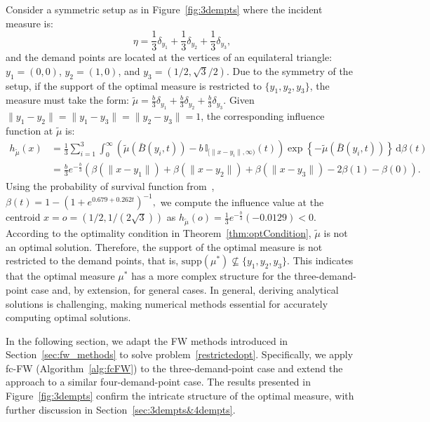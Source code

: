 \documentclass[stsy,sglanonrev]{informs4}
\newcommand{\death}{{\beta}}
\begin{document}
Consider a symmetric setup as in Figure~\ref{fig:3dempts} where the incident measure is:
\begin{equation*}
    \eta = \frac{1}{3} \delta_{y_1} + \frac{1}{3} \delta_{y_2} + \frac{1}{3} \delta_{y_3},
\end{equation*}
and the demand points are located at the vertices of an equilateral triangle: \(y_1 = (0,0)\), \(y_2 = (1,0)\), and \(y_3 = \left(1/2, \sqrt{3}/2\right)\). Due to the symmetry of the setup, if the support of the optimal measure is restricted to \(\{y_1, y_2, y_3\}\), the measure must take the form:
$\tilde{\mu} = \frac{b}{3} \delta_{y_1} + \frac{b}{3} \delta_{y_2} + \frac{b}{3} \delta_{y_3}.$ Given \(\|y_1 - y_2\| = \|y_1 - y_3\| = \|y_2 - y_3\| = 1\), the corresponding influence function at \(\tilde{\mu}\) is:
\begin{align}
    h_{\tilde{\mu}}(x) &= \frac{1}{3}\sum_{i=1}^3 \int_0^{\infty} 
    \left( \tilde{\mu}\left(\bar{B}(y_i,t) \right) - b \, \mathbb{I}_{[\|x-y_i \|,\infty)}(t) \right) 
    \exp\left\{-\tilde{\mu}\left(\bar{B}(y_i,t) \right) \right\} \, \mathrm{d}\death(t) \nonumber \\ 
    &= \frac{b}{3} e^{-\frac{b}{3}} \left( 
        \death(\|x-y_1 \|) + \death(\|x-y_2 \|) + \death(\|x-y_3 \|) - 2\death(1) - \death(0) \right).
\end{align} Using the probability of survival function from~\cite{waalewijn2001survival,van2024modeling}, $\death(t) = 1 - \left(1 + e^{0.679 + 0.262t}\right)^{-1},$ we compute the influence value at the centroid \(x = o = (1/2, 1/(2\sqrt 3))\) as $h_{\tilde{\mu}}(o) = \frac{1}{3} e^{-\frac{b}{3}} (-0.0129) < 0.$ According to the optimality condition in Theorem~\ref{thm:optCondition}, \(\tilde{\mu}\) is not an optimal solution. Therefore, the support of the optimal measure is not restricted to the demand points, that is, \(\mathrm{supp}(\mu^*) \not\subseteq \{y_1, y_2, y_3\}\). This indicates that the optimal measure \(\mu^*\) has a more complex structure for the three-demand-point case and, by extension, for general cases. In general, deriving analytical solutions is challenging, making numerical methods essential for accurately computing optimal solutions.

In the following section, we adapt the FW methods introduced in Section~\ref{sec:fw_methods} to solve problem~\eqref{restrictedopt}. Specifically, we apply fc-FW (Algorithm~\ref{alg:fcFW}) to the three-demand-point case and extend the approach to a similar four-demand-point case. The results presented in Figure~\ref{fig:3dempts} confirm the intricate structure of the optimal measure, with further discussion in Section~\ref{sec:3dempts&4dempts}.
\end{document}
